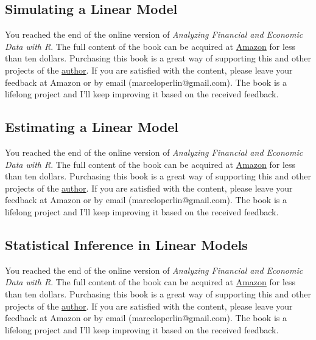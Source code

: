 \documentclass[
  12pt,
]{book}
\newenvironment{pleasebuyit}
{\begin{noteblock}
		
	} {\end{noteblock}}
\begin{document}
\hypertarget{simulating-a-linear-model}{%
\subsection{Simulating a Linear Model}\label{simulating-a-linear-model}}

\begin{pleasebuyit}
You reached the end of the online version of \emph{Analyzing Financial
and Economic Data with R}. The full content of the book can be acquired
at \href{https://www.amazon.com/dp/B084LSNXMN}{Amazon} for less than ten
dollars. Purchasing this book is a great way of supporting this and
other projects of the \href{https://www.msperlin.com/}{author}. If you
are satisfied with the content, please leave your feedback at Amazon or
by email (marceloperlin@gmail.com). The book is a lifelong project and
I'll keep improving it based on the received feedback.
\end{pleasebuyit}

\hypertarget{estimating-ols}{%
\subsection{Estimating a Linear Model}\label{estimating-ols}}

\begin{pleasebuyit}
You reached the end of the online version of \emph{Analyzing Financial
and Economic Data with R}. The full content of the book can be acquired
at \href{https://www.amazon.com/dp/B084LSNXMN}{Amazon} for less than ten
dollars. Purchasing this book is a great way of supporting this and
other projects of the \href{https://www.msperlin.com/}{author}. If you
are satisfied with the content, please leave your feedback at Amazon or
by email (marceloperlin@gmail.com). The book is a lifelong project and
I'll keep improving it based on the received feedback.
\end{pleasebuyit}

\hypertarget{testing-ols}{%
\subsection{Statistical Inference in Linear Models}\label{testing-ols}}

\begin{pleasebuyit}
You reached the end of the online version of \emph{Analyzing Financial
and Economic Data with R}. The full content of the book can be acquired
at \href{https://www.amazon.com/dp/B084LSNXMN}{Amazon} for less than ten
dollars. Purchasing this book is a great way of supporting this and
other projects of the \href{https://www.msperlin.com/}{author}. If you
are satisfied with the content, please leave your feedback at Amazon or
by email (marceloperlin@gmail.com). The book is a lifelong project and
I'll keep improving it based on the received feedback.
\end{pleasebuyit}
\end{document}

